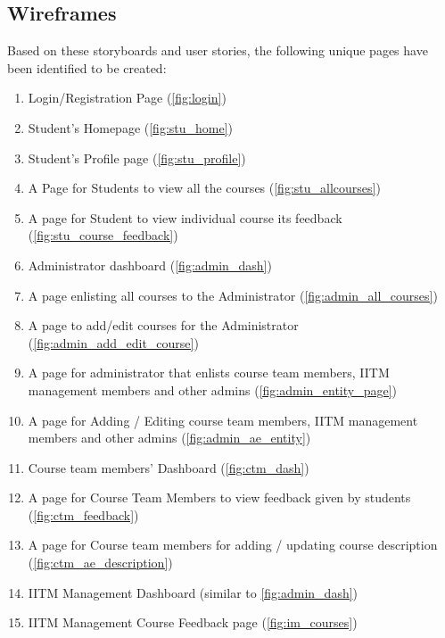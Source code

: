 \subsection{Wireframes}
Based on these storyboards and user stories, the following unique pages have been identified to be created:
\begin{enumerate}
    \tightlist
    \item Login/Registration Page (\autoref{fig:login})
    \item Student's Homepage (\autoref{fig:stu_home})
    \item Student's Profile page (\autoref{fig:stu_profile})
    \item A Page for Students to view all the courses (\autoref{fig:stu_allcourses})
    \item A page for Student to view individual course its feedback (\autoref{fig:stu_course_feedback})
    \item Administrator dashboard (\autoref{fig:admin_dash})
    \item A page enlisting all courses to the Administrator (\autoref{fig:admin_all_courses})
    \item A page to add/edit courses for the Administrator (\autoref{fig:admin_add_edit_course})
    \item A page for administrator that enlists course team members, IITM management members and other admins (\autoref{fig:admin_entity_page})
    \item A page for Adding / Editing course team members, IITM management members and other admins (\autoref{fig:admin_ae_entity})
    \item Course team members’ Dashboard (\autoref{fig:ctm_dash})
    \item A page for Course Team Members to view feedback given by students (\autoref{fig:ctm_feedback})
    \item A page for Course team members for adding / updating course description (\autoref{fig:ctm_ae_description})
    \item IITM Management Dashboard (similar to \autoref{fig:admin_dash})
    \item IITM Management Course Feedback page (\autoref{fig:im_courses})
\end{enumerate}

